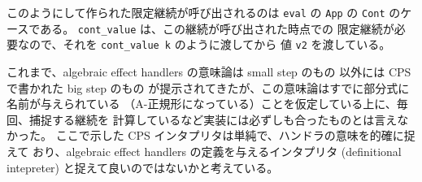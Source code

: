 このようにして作られた限定継続が呼び出されるのは \texttt{eval} の
\texttt{App} の \texttt{Cont} のケースである。
\texttt{cont\_value} は、この継続が呼び出された時点での
限定継続が必要なので、それを \texttt{cont\_value k} のように渡してから
値 \texttt{v2} を渡している。

これまで、algebraic effect handlers の意味論は small step のもの
\cite{10.1145/2500365.2500590, PRETNAR201519}
以外には
CPS で書かれた big step のもの
\cite{e6cb0c3222794e48bf38cf44e46fe4aa}
が提示されてきたが、この意味論はすでに部分式に名前が与えられている
（A-正規形になっている）ことを仮定している上に、毎回、捕捉する継続を
計算しているなど実装には必ずしも合ったものとは言えなかった。
ここで示した CPS インタプリタは単純で、ハンドラの意味を的確に捉えて
おり、algebraic effect handlers の定義を与えるインタプリタ (definitional
intepreter) と捉えて良いのではないかと考えている。

